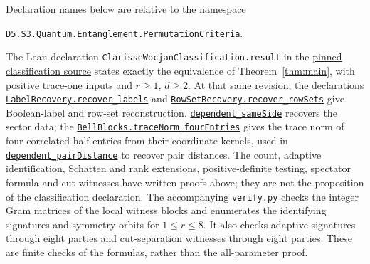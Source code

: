 \documentclass[11pt]{article}
\begin{document}
\begin{flushleft}\small
Declaration names below are relative to the namespace\par
\texttt{D5.S3.Quantum.Entanglement.PermutationCriteria}.\par
The Lean declaration \texttt{ClarisseWocjanClassification.result} in the
\href{https://github.com/the-omega-institute/trureturing/blob/3464bc4487b2236dab97aaf7bbed237f0db28b71/D5/S3/Quantum/Entanglement/PermutationCriteria/ClarisseWocjanClassification.lean}{pinned classification source}
states exactly the equivalence of Theorem~\ref{thm:main}, with positive
trace-one inputs and $r\geq1$, $d\geq2$.
At that same revision, the declarations
\href{https://github.com/the-omega-institute/trureturing/blob/3464bc4487b2236dab97aaf7bbed237f0db28b71/D5/S3/Quantum/Entanglement/PermutationCriteria/LabelRecovery.lean}{\texttt{LabelRecovery.recover\_labels}}
and
\href{https://github.com/the-omega-institute/trureturing/blob/3464bc4487b2236dab97aaf7bbed237f0db28b71/D5/S3/Quantum/Entanglement/PermutationCriteria/RowSetRecovery.lean}{\texttt{RowSetRecovery.recover\_rowSets}}
give Boolean-label and row-set reconstruction.
\href{https://github.com/the-omega-institute/trureturing/blob/3464bc4487b2236dab97aaf7bbed237f0db28b71/D5/S3/Quantum/Entanglement/PermutationCriteria/Witnesses.lean}{\texttt{dependent\_sameSide}}
recovers the sector data; the
\href{https://github.com/the-omega-institute/trureturing/blob/3464bc4487b2236dab97aaf7bbed237f0db28b71/D5/S3/Quantum/Entanglement/PermutationCriteria/BellBlocks.lean}{\texttt{BellBlocks.traceNorm\_fourEntries}}
gives the trace norm of four correlated half entries from their coordinate
kernels, used in
\href{https://github.com/the-omega-institute/trureturing/blob/3464bc4487b2236dab97aaf7bbed237f0db28b71/D5/S3/Quantum/Entanglement/PermutationCriteria/BellWitnesses.lean}{\texttt{dependent\_pairDistance}}
to recover pair distances.
The count, adaptive identification, Schatten and rank extensions,
positive-definite testing, spectator formula and cut witnesses have written proofs above;
they are not the proposition of the classification declaration.
The accompanying
\texttt{verify.py} checks the integer Gram matrices of the local witness
blocks and enumerates the identifying signatures and symmetry orbits
for $1\leq r\leq8$. It also checks adaptive signatures through eight
parties and cut-separation witnesses through eight parties.
These are finite checks of the formulas, rather than the all-parameter proof.
\end{flushleft}
\end{document}
